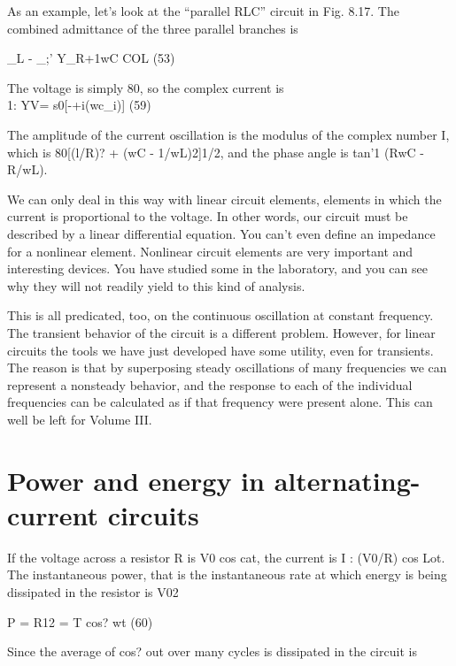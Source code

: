 {As an example, let's look at the ``parallel RLC'' circuit in
Fig. 8.17. The combined admittance of the three parallel branches is

\begin{equation}
\end{equation}
_L - _;'
Y_R+1wC COL (53)

The voltage is simply 80, so the complex current is
\begin{equation}
\end{equation}
1: YV= s0[-+i(wc_i)] (59)

The amplitude of the current oscillation is the modulus of the complex
number I, which is 80[(l/R)? + (wC - 1/wL)2]1/2, and the
phase angle is tan'1 (RwC - R/wL).

We can only deal in this way with linear circuit elements, elements
in which the current is proportional to the voltage. In other words,
our circuit must be described by a linear differential equation. You
can't even define an impedance for a nonlinear element. Nonlinear
circuit elements are very important and interesting devices. You
have studied some in the laboratory, and you can see why they will
not readily yield to this kind of analysis.

This is all predicated, too, on the continuous oscillation at constant
frequency. The transient behavior of the circuit is a different
problem. However, for linear circuits the tools we have just developed
have some utility, even for transients. The reason is that by
superposing steady oscillations of many frequencies we can represent
a nonsteady behavior, and the response to each of the individual
frequencies can be calculated as if that frequency were present alone.
This can well be left for Volume III.

\section{Power and energy in alternating-current circuits}
If the voltage across a resistor R is V0 cos cat, the current is
I : (V0/R) cos Lot. The instantaneous power, that is the instantaneous
rate at which energy is being dissipated in the resistor is
V02

\begin{equation}
\end{equation}
P = R12 = T cos? wt (60)

Since the average of cos? out over many cycles is %
dissipated in the circuit is

}
